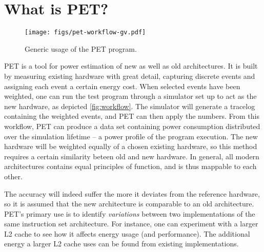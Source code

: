 \section{What is PET?}
\label{sec:whatispet}
\begin{figure}
    \texttt{[image: figs/pet-workflow-gv.pdf]}
    \caption{Generic usage of the PET program.}
    \label{fig:workflow}
\end{figure}

PET is a tool for power estimation of new as well as old architectures. It is
built by measuring existing hardware with great detail, capturing discrete events
and assigning each event a certain energy cost. When selected events have been
weighted, one can run the test program through a simulator set up to act as the
new hardware, as depicted \autoref{fig:workflow}. The simulator will generate a
tracelog containing the weighted events, and PET can then apply the numbers.
From this workflow, PET can produce a data set containing power consumption
distributed over the simulation lifetime -- a power profile of the program
execution. The new hardware will be weighted equally of a chosen existing
hardware, so this method requires a certain similarity beteen old and new
hardware. In general, all modern architectures contains equal principles
of function, and is thus mappable to each other.

The accuracy will indeed suffer the more it deviates from the reference
hardware, so it is assumed that the new architecture is comparable to an old
architecture. PET's primary use is to identify \emph{variations} between two
implementations of the same instruction set architecture. For instance, one can
experiment with a larger L2 cache to see how it affects energy usage (and
performance). The additional energy a larger L2 cache uses can be found from
existing implementations.

